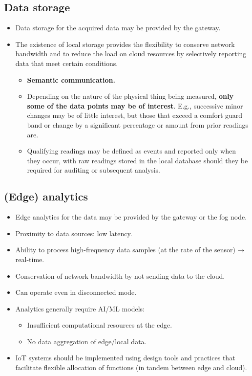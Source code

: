 \documentclass[a4paper, 12pt]{book} %
\begin{document}
\subsection{Data storage}\label{data-storage}

\begin{itemize}
\tightlist
\item
  Data storage for the acquired data may be provided by the gateway.
\item
  The existence of local storage provides the flexibility to conserve
  network bandwidth and to reduce the load on cloud resources by
  selectively reporting data that meet certain conditions.

  \begin{itemize}
  \tightlist
  \item
    \textbf{Semantic communication.}
  \item
    Depending on the nature of the physical thing being measured,
    \textbf{only some of the data points may be of interest}. E.g.,
    successive minor changes may be of little interest, but those that
    exceed a comfort guard band or change by a significant percentage or
    amount from prior readings are.
  \item
    Qualifying readings may be defined as events and reported only when
    they occur, with raw readings stored in the local database should
    they be required for auditing or subsequent analysis.
  \end{itemize}
\end{itemize}

\subsection{(Edge) analytics}\label{edge-analytics}

\begin{itemize}
\tightlist
\item
  Edge analytics for the data may be provided by the gateway or the fog
  node.
\item
  Proximity to data sources: low latency.
\item
  Ability to process high-frequency data samples (at the rate of the
  sensor) → real-time.
\item
  Conservation of network bandwidth by not sending data to the cloud.
\item
  Can operate even in disconnected mode.
\item
  Analytics generally require AI/ML models:

  \begin{itemize}
  \tightlist
  \item
    Insufficient computational resources at the edge.
  \item
    No data aggregation of edge/local data.
  \end{itemize}
\item
  IoT systems should be implemented using design tools and practices
  that facilitate flexible allocation of functions (in tandem between
  edge and cloud).
\end{itemize}
\end{document}
